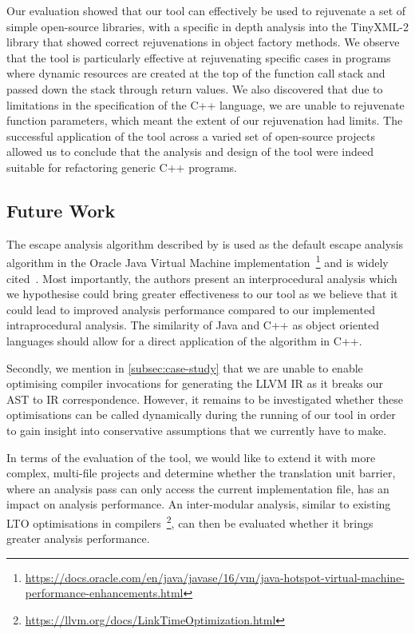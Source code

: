 \documentclass{mpaper}
\begin{document}
    Our evaluation showed that our tool can effectively be used to rejuvenate a set of simple open-source libraries, with a specific in depth analysis into the TinyXML-2 library that showed correct rejuvenations in object factory methods. 
    We observe that the tool is particularly effective at rejuvenating specific cases in programs where dynamic resources are created at the top of the function call stack and passed down the stack through return values. 
    We also discovered that due to limitations in the specification of the C++ language, we are unable to rejuvenate function parameters, which meant the extent of our rejuvenation had limits.
    The successful application of the tool across a varied set of open-source projects allowed us to conclude that the analysis and design of the tool were indeed suitable for refactoring generic C++ programs. 
    
    \subsection{Future Work}
    
    The escape analysis algorithm described by \citet{Choi1999} is used as the default escape analysis algorithm in the Oracle Java Virtual Machine implementation~\footnote{\url{https://docs.oracle.com/en/java/javase/16/vm/java-hotspot-virtual-machine-performance-enhancements.html}} and is widely cited~\cite{Wang2020, Stadler2014}.
    Most importantly, the authors present an interprocedural analysis which we hypothesise could bring greater effectiveness to our tool as we believe that it could lead to improved analysis performance compared to our implemented intraprocedural analysis. 
    The similarity of Java and C++ as object oriented languages should allow for a direct application of the algorithm in C++.
    
    Secondly, we mention in \autoref{subsec:case-study} that we are unable to enable optimising compiler invocations for generating the LLVM IR as it breaks our AST to IR correspondence. 
    However, it remains to be investigated whether these optimisations can be called dynamically during the running of our tool in order to gain insight into conservative assumptions that we currently have to make. 
    
    In terms of the evaluation of the tool, we would like to extend it with more complex, multi-file projects and determine whether the translation unit barrier, where an analysis pass can only access the current implementation file, has an impact on analysis performance.
    An inter-modular analysis, similar to existing LTO optimisations in compilers~\footnote{\url{https://llvm.org/docs/LinkTimeOptimization.html}}, can then be evaluated whether it brings greater analysis performance. 
    
\end{document}

